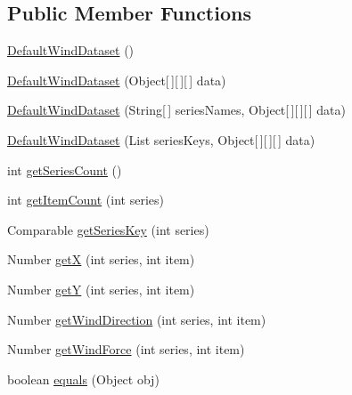 \subsection*{Public Member Functions}
\begin{DoxyCompactItemize}
\item 
\mbox{\hyperlink{classorg_1_1jfree_1_1data_1_1xy_1_1_default_wind_dataset_aac34ccb95e5cf373f6cb2a22993db505}{Default\+Wind\+Dataset}} ()
\item 
\mbox{\hyperlink{classorg_1_1jfree_1_1data_1_1xy_1_1_default_wind_dataset_abbb7ce3f458389d28ca99312bc824ec9}{Default\+Wind\+Dataset}} (Object\mbox{[}$\,$\mbox{]}\mbox{[}$\,$\mbox{]}\mbox{[}$\,$\mbox{]} data)
\item 
\mbox{\hyperlink{classorg_1_1jfree_1_1data_1_1xy_1_1_default_wind_dataset_a6f727603c8de64f0e6a3af3798abaa2f}{Default\+Wind\+Dataset}} (String\mbox{[}$\,$\mbox{]} series\+Names, Object\mbox{[}$\,$\mbox{]}\mbox{[}$\,$\mbox{]}\mbox{[}$\,$\mbox{]} data)
\item 
\mbox{\hyperlink{classorg_1_1jfree_1_1data_1_1xy_1_1_default_wind_dataset_acb6a3aca0dc3e10e3d79abc98e9b6f39}{Default\+Wind\+Dataset}} (List series\+Keys, Object\mbox{[}$\,$\mbox{]}\mbox{[}$\,$\mbox{]}\mbox{[}$\,$\mbox{]} data)
\item 
int \mbox{\hyperlink{classorg_1_1jfree_1_1data_1_1xy_1_1_default_wind_dataset_a8d559f3bb1908b9870cf6dcf5a5d653a}{get\+Series\+Count}} ()
\item 
int \mbox{\hyperlink{classorg_1_1jfree_1_1data_1_1xy_1_1_default_wind_dataset_a40e8e83a09112bf32478cdd8bc906800}{get\+Item\+Count}} (int series)
\item 
Comparable \mbox{\hyperlink{classorg_1_1jfree_1_1data_1_1xy_1_1_default_wind_dataset_ac48b53bd5cb10baaad8e0ab89aa4f6ef}{get\+Series\+Key}} (int series)
\item 
Number \mbox{\hyperlink{classorg_1_1jfree_1_1data_1_1xy_1_1_default_wind_dataset_af62edd939cd88c0bf2350231798c3892}{getX}} (int series, int item)
\item 
Number \mbox{\hyperlink{classorg_1_1jfree_1_1data_1_1xy_1_1_default_wind_dataset_a51ae6185e5c71a07e8e2f496e101e868}{getY}} (int series, int item)
\item 
Number \mbox{\hyperlink{classorg_1_1jfree_1_1data_1_1xy_1_1_default_wind_dataset_aa548182054c24afc0a4e2ac429fe81e9}{get\+Wind\+Direction}} (int series, int item)
\item 
Number \mbox{\hyperlink{classorg_1_1jfree_1_1data_1_1xy_1_1_default_wind_dataset_a39588ba40d03b43b02d85b20027eab4f}{get\+Wind\+Force}} (int series, int item)
\item 
boolean \mbox{\hyperlink{classorg_1_1jfree_1_1data_1_1xy_1_1_default_wind_dataset_a95e989ffe9607d222a85dbf30e8279e5}{equals}} (Object obj)
\end{DoxyCompactItemize}
